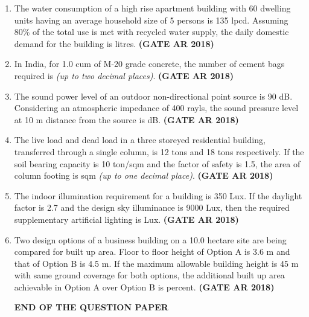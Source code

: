 \documentclass[journal,15pt,onecolumn]{IEEEtran}
\theoremstyle{remark}
\begin{document}
\begin{enumerate}
\item 
The water consumption of a high rise apartment building with 60 dwelling units having an average household size of 5 persons is 135 lpcd. Assuming 80\% of the total use is met with recycled water supply, the daily domestic demand for the building is \underline{\hspace{3cm}} litres.\hfill \textbf{ (GATE AR 2018)}




\item 
In India, for 1.0 cum of M-20 grade concrete, the number of cement bags required is \underline{\hspace{3cm}} \emph{(up to two decimal places)}.\hfill \textbf{ (GATE AR 2018)}


\item 
The sound power level of an outdoor non-directional point source is 90 dB. Considering an atmospheric impedance of 400 rayls, the sound pressure level at 10 m distance from the source is \underline{\hspace{3cm}} dB.\hfill \textbf{ (GATE AR 2018)}


\item 
The live load and dead load in a three storeyed residential building, transferred through a single column, is 12 tons and 18 tons respectively. If the soil bearing capacity is 10 ton/sqm and the factor of safety is 1.5, the area of column footing is \underline{\hspace{3cm}} sqm \emph{(up to one decimal place)}.\hfill \textbf{ (GATE AR 2018)}


\item 
The indoor illumination requirement for a building is 350 Lux. If the daylight factor is 2.7 and the design sky illuminance is 9000 Lux, then the required supplementary artificial lighting is \underline{\hspace{3cm}} Lux.\hfill \textbf{ (GATE AR 2018)}


    \item 
    Two design options of a business building on a 10.0 hectare site are being compared for built up area. Floor to floor height of Option A is 3.6 m and that of Option B is 4.5 m. If the maximum allowable building height is 45 m with same ground coverage for both options, the additional built up area achievable in Option A over Option B is \underline{\hspace{3cm}} percent.
    \hfill \textbf{ (GATE AR 2018)}

\begin{center}
\textbf{END OF THE QUESTION PAPER}
\end{center}




\end{enumerate}
\end{document}
